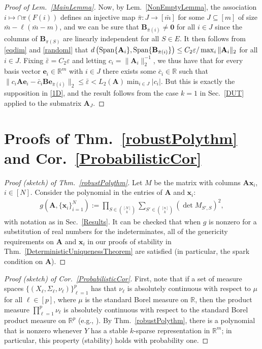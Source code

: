 \documentclass[9pt,twocolumn]{pnas-new}
\begin{document}
\begin{proof}[Proof of Lem.~\ref{MainLemma}]
Now, by Lem.~\ref{NonEmptyLemma}, the association $i \mapsto \cap \pi(F(i))$ defines an injective map $\bar \pi: J \to [\bar m]$ for some $J \subseteq [m]$ of size $\bar m - \ell(\bar m - m)$, and we can be sure that $\mathbf{B}_{\bar \pi(i)} \neq \mathbf{0}$ for all $i \in J$ since the columns of $\mathbf{B}_{\pi(S)}$ are linearly independent for all $S \in E$. It then follows from \eqref{eqdim} and \eqref{randoml} that $d\left( \text{\rm Span}\{\mathbf{A}_i\}, \text{\rm Span}\{ \mathbf{B}_{\bar \pi(i)} \} \right) \leq C_2 \varepsilon / \max_i \|\mathbf{A}_i\|_2$ for all $i \in J$. Fixing $\bar \varepsilon = C_2\varepsilon$ and letting $c_i = \|\mathbf{A}_i\|_2^{-1}$, we thus have that for every basis vector $\mathbf{e}_i \in \mathbb{R}^m$ with $i \in J$ there exists some $\bar{c}_i \in \mathbb{R}$ such that $\|c_i\mathbf{A}\mathbf{e}_i - \bar{c}_i \mathbf{B}\mathbf{e}_{\bar \pi(i)}\|_2 \leq \bar \varepsilon < L_2(\mathbf{A}) \min_{i\in J} |c_i|$.  But this is exactly the supposition in \eqref{1D}, and the result follows from the case $k=1$ in Sec.~\ref{DUT} applied to the submatrix $\mathbf{A}_J$.
\end{proof}

\section{Proofs of Thm.~\ref{robustPolythm} and Cor.~\ref{ProbabilisticCor}}

\begin{proof}[Proof (sketch) of Thm.~\ref{robustPolythm}]
Let $M$ be the matrix with columns $\mathbf{A}\mathbf{x}_i$, $i \in [N]$.  Consider the polynomial in the entries of $\mathbf{A}$ and $\mathbf{x}_i$:
\begin{align*}
g(\mathbf{A}, \{\mathbf{x}_i\}_{i=1}^N) := \prod_{S \in {[N] \choose k}} \sum_{S' \in {[n] \choose k}} (\det M_{S',S})^2,
\end{align*}
with notation as in Sec.~\ref{Results}.  
It can be checked that when $g$ is nonzero for a substitution of real numbers for the indeterminates, all of the genericity requirements on $\mathbf{A}$ and $\mathbf{x}_i$ in our proofs of stability in Thm.~\ref{DeterministicUniquenessTheorem} are satisfied (in particular, the spark condition on $\mathbf{A}$).
\end{proof}

\begin{proof}[Proof (sketch) of Cor.~\ref{ProbabilisticCor}]
First, note that if a set of measure spaces $\{(X_{\ell}, \Sigma_{\ell}, \nu_{\ell})\}_{\ell=1}^p$ has that $\nu_{\ell}$ is absolutely continuous with respect to $\mu$ for all $\ell \in [p]$, where $\mu$ is the standard Borel measure on $\mathbb{R}$, then the product measure $\prod_{\ell=1}^p \nu_{\ell}$ is absolutely continuous with respect to the standard Borel product measure on $\mathbb{R}^p$ (e.g.,  \cite{folland2013real}). By Thm.~\ref{robustPolythm}, there is a polynomial that is nonzero whenever $Y$ has a stable $k$-sparse representation in $\mathbb{R}^m$; in particular, this property (stability) holds with probability one.
\end{proof}

\pnasbreak
\end{document}

